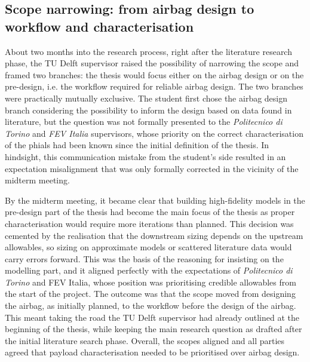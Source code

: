 \subsection{Scope narrowing: from airbag design to workflow and characterisation}
\label{subsec:pm-scope}
About two months into the research process, right after the literature research phase, the TU Delft supervisor raised the possibility of narrowing the scope and framed two branches: the thesis would focus either on the airbag design or on the pre-design, i.e. the workflow required for reliable airbag design. The two branches were practically mutually exclusive. The student first chose the airbag design branch considering the possibility to inform the design based on data found in literature, but the question was not formally presented to the \textit{Politecnico di Torino} and \textit{FEV Italia} supervisors, whose priority on the correct characterisation of the phials had been known since the initial definition of the thesis. In hindsight, this communication mistake from the student's side resulted in an expectation misalignment that was only formally corrected in the vicinity of the midterm meeting.

By the midterm meeting, it became clear that building high-fidelity models in the pre-design part of the thesis had become the main focus of the thesis as proper characterisation would require more iterations than planned. This decision was cemented by the realisation that the downstream sizing depends on the upstream allowables, so sizing on approximate models or scattered literature data would carry errors forward. This was the basis of the reasoning for insisting on the modelling part, and it aligned perfectly with the expectations of \textit{Politecnico di Torino} and FEV Italia, whose position was prioritising credible allowables from the start of the project. The outcome was that the scope moved from designing the airbag, as initially planned, to the workflow before the design of the airbag. This meant taking the road the TU Delft supervisor had already outlined at the beginning of the thesis, while keeping the main research question as drafted after the initial literature search phase. Overall, the scopes aligned and all parties agreed that payload characterisation needed to be prioritised over airbag design.
 
